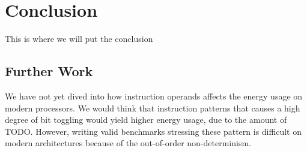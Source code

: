 \section{Conclusion}
This is where we will put the conclusion

\subsection{Further Work}

We have not yet dived into how instruction operands affects the energy usage on
modern processors. We would think that instruction patterns that causes a high
degree of bit toggling would yield higher energy usage, due to the amount of
TODO. However, writing valid benchmarks stressing these pattern is difficult on
modern architectures because of the out-of-order non-determinism.
